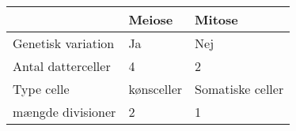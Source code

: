 \begin{longtable}{ | m{5cm} | m{5cm} | m{5cm} | }
    \hline 
    & Meiose & Mitose \\ \hline
    Genetisk variation & Ja & Nej \\ \hline
    Antal datterceller & 4 & 2 \\ \hline
    Type celle & kønsceller & Somatiske celler \\ \hline
    mængde divisioner & 2 & 1 \\ \hline
\end{longtable}